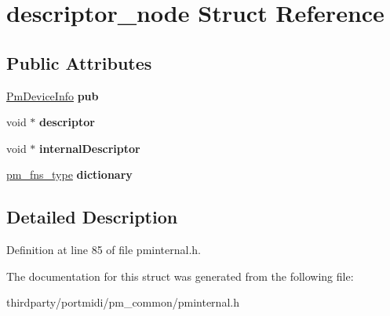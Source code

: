 \hypertarget{structdescriptor__node}{}\section{descriptor\+\_\+node Struct Reference}
\label{structdescriptor__node}
\subsection*{Public Attributes}
\begin{DoxyCompactItemize}
\item 
\mbox{\label{structdescriptor__node_a63b20f87d756eab969d3352103322516}} 
\hyperlink{struct_pm_device_info}{Pm\+Device\+Info} {\bfseries pub}
\item 
\mbox{\label{structdescriptor__node_a6a355a03bd3961544ca836f2e3fe477a}} 
void $\ast$ {\bfseries descriptor}
\item 
\mbox{\label{structdescriptor__node_a5e90cf08a561afbc02fa8ac72264bb9a}} 
void $\ast$ {\bfseries internal\+Descriptor}
\item 
\mbox{\label{structdescriptor__node_a79791dac344af440b10af2ab9cee26e3}} 
\hyperlink{structpm__fns__node}{pm\+\_\+fns\+\_\+type} {\bfseries dictionary}
\end{DoxyCompactItemize}


\subsection{Detailed Description}


Definition at line 85 of file pminternal.\+h.



The documentation for this struct was generated from the following file\+:\begin{DoxyCompactItemize}
\item 
thirdparty/portmidi/pm\+\_\+common/pminternal.\+h\end{DoxyCompactItemize}
